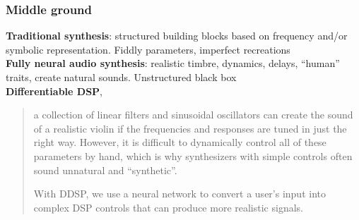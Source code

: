 \documentclass{beamer}
\begin{document}

\begin{frame}
\frametitle{Middle ground}
	\textbf{\textcolor{burgundy}{Traditional synthesis}}: structured building blocks based on frequency and/or symbolic representation. Fiddly parameters, imperfect recreations\\
	\textbf{\textcolor{burgundy}{Fully neural audio synthesis}}: realistic timbre, dynamics, delays, ``human'' traits, create natural sounds. Unstructured black box\\
	\textbf{\textcolor{ao(english)}{Differentiable DSP}}, 
	\begin{quote}
		a collection of linear filters and sinusoidal oscillators can create the sound of a realistic violin if the frequencies and responses are tuned in just the right way. However, it is difficult to dynamically control all of these parameters by hand, which is why synthesizers with simple controls often sound unnatural and ``synthetic''.

		With DDSP, we use a neural network to convert a user's input into complex DSP controls that can produce more realistic signals.
	\end{quote}
\end{frame}

\end{document}
